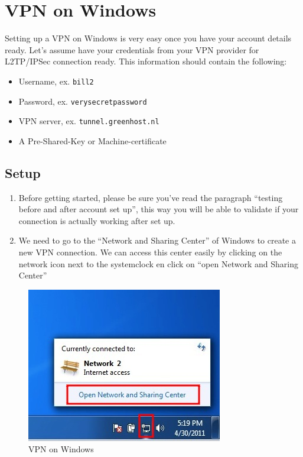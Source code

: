 \section{VPN on Windows}

Setting up a VPN on Windows is very easy once you have your account
details ready. Let's assume have your credentials from your VPN provider
for L2TP/IPSec connection ready. This information should contain the
following:

\begin{itemize}
\item
  Username, ex. \verb!bill2!
\item
  Password, ex. \verb!verysecretpassword!
\item
  VPN server, ex. \verb!tunnel.greenhost.nl!
\item
  A Pre-Shared-Key or Machine-certificate
\end{itemize}
\subsection{Setup}

\begin{enumerate}[1.]
\item
  Before getting started, please be sure you've read the paragraph
  ``testing before and after account set up'', this way you will be able
  to validate if your connection is actually working after set up.
\item
  We need to go to the ``Network and Sharing Center'' of Windows to
  create a new VPN connection. We can access this center easily by
  clicking on the network icon next to the systemclock en click on
  ``open Network and Sharing Center''
\end{enumerate}
\begin{figure}[htbp]
\centering
\includegraphics{vpn_windows_01.jpg}
\caption{VPN on Windows}
\end{figure}

